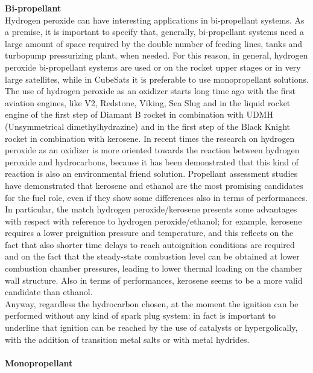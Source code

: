 \documentclass[a4paper]{report}
\begin{document}
\textbf{Bi-propellant}\\

Hydrogen peroxide can have interesting applications in bi-propellant systems. As a premise, it is important to specify that, generally, bi-propellant systems need a large amount of space required by the double number of feeding lines, tanks and turbopump pressurizing plant, when needed. For this reason, in general, hydrogen peroxide bi-propellant systems are used or on the rocket upper stages or in very large satellites, while in CubeSats it is preferable to use monopropellant solutions. \\
The use of hydrogen peroxide as an oxidizer starts long time ago with the first aviation engines, like V2, Redstone, Viking, Sea Slug and in the liquid rocket engine of the first step of Diamant B rocket in combination with UDMH (Unsymmetrical dimethylhydrazine) and in the first step of the Black Knight rocket in combination with kerosene. %
In recent times the research on hydrogen peroxide as an oxidizer is more oriented towards the reaction between hydrogen peroxide and hydrocarbons, because it has been demonstrated that this kind of reaction is also an environmental friend solution. Propellant assessment studies have demonstrated that kerosene and ethanol are the most promising candidates for the fuel role, even if they show some differences also in terms of performances. In particular, the match hydrogen peroxide/kerosene presents some advantages with respect with reference to hydrogen peroxide/ethanol; for example, kerosene requires a lower preignition pressure and temperature, and this reflects on the fact that also shorter time delays to reach autoignition conditions are required and on the fact that the steady-state combustion level can be obtained at lower combustion chamber pressures, leading to lower thermal loading on the chamber wall structure. %
Also in terms of performances, kerosene seems to be a more valid candidate than ethanol. \\
Anyway, regardless the hydrocarbon chosen, at the moment the ignition can be performed without any kind of spark plug system: in fact is important to underline that ignition can be reached by the use of catalysts or hypergolically, with the addition of transition metal salts or with metal hydrides.\\ %
\\
\textbf{Monopropellant}\\
\end{document}
